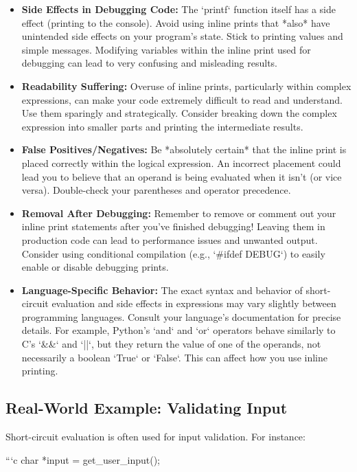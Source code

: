 \documentclass{article}
\begin{document}
{{{{\begin{itemize}
    \item \textbf{Side Effects in Debugging Code:}  The `printf` function itself has a side effect (printing to the console).  Avoid using inline prints that *also* have unintended side effects on your program's state.  Stick to printing values and simple messages.  Modifying variables within the inline print used for debugging can lead to very confusing and misleading results.
    \item \textbf{Readability Suffering:}  Overuse of inline prints, particularly within complex expressions, can make your code extremely difficult to read and understand. Use them sparingly and strategically.  Consider breaking down the complex expression into smaller parts and printing the intermediate results.
    \item \textbf{False Positives/Negatives:}  Be *absolutely certain* that the inline print is placed correctly within the logical expression. An incorrect placement could lead you to believe that an operand is being evaluated when it isn't (or vice versa).  Double-check your parentheses and operator precedence.
    \item \textbf{Removal After Debugging:}  Remember to remove or comment out your inline print statements after you've finished debugging! Leaving them in production code can lead to performance issues and unwanted output.  Consider using conditional compilation (e.g., `#ifdef DEBUG`) to easily enable or disable debugging prints.
    \item \textbf{Language-Specific Behavior:}  The exact syntax and behavior of short-circuit evaluation and side effects in expressions may vary slightly between programming languages. Consult your language's documentation for precise details. For example, Python's `and` and `or` operators behave similarly to C's `&&` and `||`, but they return the value of one of the operands, not necessarily a boolean `True` or `False`. This can affect how you use inline printing.
\end{itemize}

\subsection*{Real-World Example: Validating Input}

Short-circuit evaluation is often used for input validation. For instance:

```c
char *input = get_user_input();

}}}}
\end{document}
